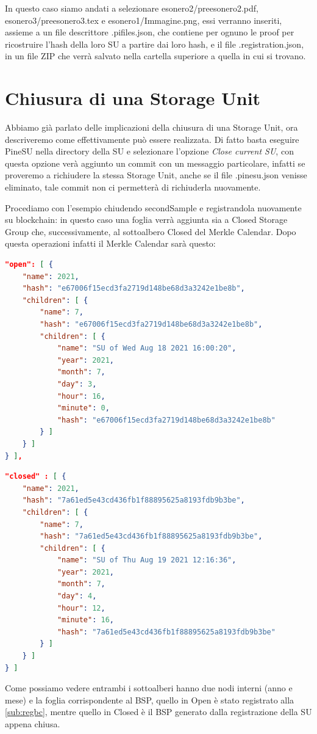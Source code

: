 In questo caso siamo andati a selezionare \textsf{esonero2/preesonero2.pdf},
\textsf{esonero3/preesonero3.tex} e \textsf{esonero1/Immagine.png}, essi verranno inseriti,
assieme a un file descrittore \textsf{.pifiles.json}, che contiene per ognuno le proof
per ricostruire l'hash della loro SU a partire dai loro hash, e il file \textsf{.registration.json},
in un file ZIP che verrà salvato nella cartella superiore a quella in cui si trovano.

\newpage

\section{Chiusura di una Storage Unit}
Abbiamo già parlato delle implicazioni della chiusura di una Storage Unit, ora descriveremo come
effettivamente può essere realizzata. Di fatto basta eseguire PineSU nella directory della SU e
selezionare l'opzione \emph{Close current SU}, con questa opzione verà aggiunto un commit con un
messaggio particolare, infatti se proveremo a richiudere la stessa Storage Unit, anche se
il file \textsf{.pinesu.json} venisse eliminato, tale commit non ci permetterà di richiuderla
nuovamente.

Procediamo con l'esempio chiudendo \textsf{secondSample} e registrandola nuovamente
su blockchain: in questo caso una foglia verrà aggiunta sia a Closed Storage Group che,
successivamente, al sottoalbero Closed del Merkle Calendar.
Dopo questa operazioni infatti il Merkle Calendar sarà questo:


\singlespacing
\begin{lstlisting}[language=json,firstnumber=1,basicstyle=\small]
"open": [ {
    "name": 2021,
    "hash": "e67006f15ecd3fa2719d148be68d3a3242e1be8b",
    "children": [ {
        "name": 7,
        "hash": "e67006f15ecd3fa2719d148be68d3a3242e1be8b",
        "children": [ {
            "name": "SU of Wed Aug 18 2021 16:00:20",
            "year": 2021,
            "month": 7,
            "day": 3,
            "hour": 16,
            "minute": 0,
            "hash": "e67006f15ecd3fa2719d148be68d3a3242e1be8b"
        } ]
    } ]
} ],
\end{lstlisting}
\newpage\begin{lstlisting}[language=json,firstnumber=18,basicstyle=\small]
"closed" : [ {
    "name": 2021,
    "hash": "7a61ed5e43cd436fb1f88895625a8193fdb9b3be",
    "children": [ {
        "name": 7,
        "hash": "7a61ed5e43cd436fb1f88895625a8193fdb9b3be",
        "children": [ {
            "name": "SU of Thu Aug 19 2021 12:16:36",
            "year": 2021,
            "month": 7,
            "day": 4,
            "hour": 12,
            "minute": 16,
            "hash": "7a61ed5e43cd436fb1f88895625a8193fdb9b3be"
        } ]
    } ]
} ]  
\end{lstlisting}
\onehalfspacing
Come possiamo vedere entrambi i sottoalberi hanno due nodi interni (anno e mese) e la foglia
corrispondente al BSP, quello in Open è stato registrato alla \autoref{sub:regbc}, mentre quello
in Closed è il BSP generato dalla registrazione della SU appena chiusa.


